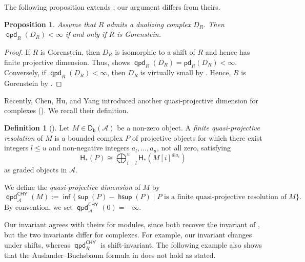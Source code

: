 \documentclass[10pt, a4paper,reqno]{amsart}
\newtheorem{prop}[prop]{Proposition}
\theoremstyle{definition}
\newtheorem{dfn}[dfn]{Definition}
\theoremstyle{remark}
\numberwithin{equation}{thm}
\def\cA{\mathcal{A}}
\def\sH{\mathsf{H}}
\def\Db{\mathsf{D_b}}
\def\sup{\operatorname{\mathsf{sup}}}
\def\hsup{\operatorname{\mathsf{hsup}}}
\def\inf{\operatorname{\mathsf{inf}}}
\def\pd{\mathsf{pd}}
\def\qpd{\operatorname{\mathsf{qpd}}}
\begin{document}
The following proposition extends \cite[Corollary 6.21]{GJT}; our argument differs from theirs.

\begin{prop}
Assume that $R$ admits a dualizing complex $D_R$.
Then $\qpd_R(D_R) < \infty$ if and only if $R$ is Gorenstein.	
\end{prop}

\begin{proof}
If $R$ is Gorenstein, then $D_R$ is isomorphic to a shift of $R$ and hence has finite projective dimension.
Thus,  shows $\qpd_R(D_R) = \pd_R(D_R) < \infty$.
Conversely, if $\qpd_R(D_R) < \infty$, then $D_R$ is virtually small by .
Hence, $R$ is Gorenstein by \cite[3.3.5]{Gbook}. 
\end{proof}



Recently, Chen, Hu, and Yang introduced another quasi-projective dimension for complexes (\cite{CHY}).
We recall their definition.

\begin{dfn}[\cite{CHY}]
Let $M \in \Db(\cA)$ be a non-zero object.
A {\em finite quasi-projective resolution} of $M$ is a bounded complex $P$ of projective objects for which there exist integers $l \le u$ and non-negative integers $a_l,\ldots,a_u$, not all zero, satisfying
\[
\sH_*(P)
\cong
\bigoplus_{i=l}^u \sH_*(M[i]^{\oplus a_i})
\]
as graded objects in $\cA$.

We define the {\em quasi-projective dimension} of $M$ by 
\[
\qpd_\cA^{\mathsf{CHY}}(M) := \inf \{\sup(P) - \hsup(P) \mid \mbox{$P$ is a finite quasi-projective resolution of $M$}\}.
\]
By convention, we set $\qpd_\cA^{\mathsf{CHY}}(0) = -\infty$.
\end{dfn}

Our invariant agrees with theirs for modules, since both recover the invariant of \cite{GJT}, but the two invariants differ for complexes.
For example, our invariant changes under shifts, whereas $\qpd_R^{\mathsf{CHY}}$ is shift-invariant.
The following example also shows that the Auslander--Buchsbaum formula in \cite[Theorem~4.4]{CHY} does not hold as stated.
\end{document}
